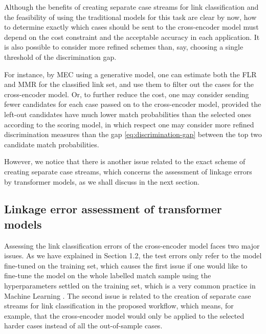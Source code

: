 Although the benefits of creating separate case streams for link classification and the
feasibility of using the traditional models for this task are clear by now, how to determine
exactly which cases should be sent to the cross-encoder model must depend on the cost
constraint and the acceptable accuracy in each application. It is also possible to consider
more refined schemes than, say, choosing a single threshold of the discrimination gap.

For instance, by MEC using a generative model, one can estimate both the FLR and MMR
for the classified link set, and use them to filter out the cases for the cross-encoder model.
Or, to further reduce the cost, one may consider sending fewer candidates for each case
passed on to the cross-encoder model, provided the left-out candidates have much lower
match probabilities than the selected ones according to the scoring model, in which
respect one may consider more refined discrimination measures than the gap
\eqref{eq:discrimination-gap} between the top two candidate match probabilities.

However, we notice that there is another issue related to the exact scheme of creating
separate case streams, which concerns the assessment of linkage errors by transformer
models, as we shall discuss in the next section. 


\subsection{Linkage error assessment of transformer models}
\label{sec:error-assessment}

Assessing the link classification errors of the cross-encoder model faces two major issues.
As we have explained in Section 1.2, the test errors only refer to the model fine-tuned on
the training set, which causes the first issue if one would like to fine-tune the model on the
whole labelled match sample using the hyperparameters settled on the training set, which
is a very common practice in Machine Learning \citep[e.g.][]{hastie2009elements}. The
second issue is related to the creation of separate case streams for link classification in the
proposed workflow, which means, for example, that the cross-encoder model would only be
applied to the selected harder cases instead of all the out-of-sample cases.

